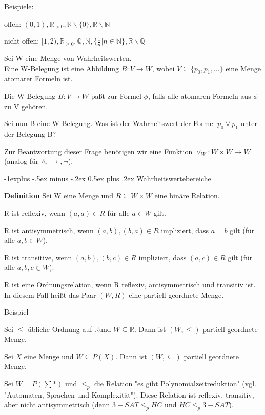 \documentclass[a4paper]{article}
\makeatletter
\renewcommand{\note}[2]{\begin{noteBox} \textbf{#1} #2 \end{noteBox}}
\renewcommand{\subsection}{\@startsection{subsection}{2}{0mm}%
                {-1explus -.5ex minus -.2ex}%
                {0.5ex plus .2ex}%
                {\normalfont\normalsize\bfseries}}
\makeatother
\begin{document}
\begin{multicols}{3}
  Beispiele:
  \begin{itemize*}
    \item offen: $(0,1), \mathbb{R}_{>0}, \mathbb{R}\backslash\{0\}, \mathbb{R}\backslash\mathbb{N}$
    \item nicht offen: $[1,2), \mathbb{R}_{\geq 0}, \mathbb{Q}, \mathbb{N}, \{\frac{1}{n} | n\in\mathbb{N}\}, \mathbb{R}\backslash\mathbb{Q}$
  \end{itemize*}


  Sei W eine Menge von Wahrheitswerten.\\
  Eine W-Belegung ist eine Abbildung $B:V\rightarrow W$, wobei $V\subseteq\{p_0 ,p_1 ,...\}$ eine Menge atomarer Formeln ist.

  Die W-Belegung $B:V\rightarrow W$ paßt zur Formel $\phi$, falls alle atomaren Formeln aus $\phi$ zu V gehören.

  Sei nun B eine W-Belegung. Was ist der Wahrheitswert der Formel $p_0\vee p_1$ unter der Belegung B?

  Zur Beantwortung dieser Frage benötigen wir eine Funktion $\vee_W :W\times W\rightarrow W$ (analog für $\wedge,\rightarrow,\lnot$).

  \subsection{Wahrheitswertebereiche}
  \note{Definition}{Sei W eine Menge und $R\subseteq W\times W$ eine binäre Relation.
    \begin{itemize*}
      \item R ist reflexiv, wenn $(a,a)\in R$ für alle $a\in W$ gilt.
      \item R ist antisymmetrisch, wenn $(a,b),(b,a)\in R$ impliziert, dass $a=b$ gilt (für alle $a,b\in W$).
      \item R ist transitive, wenn $(a,b),(b,c)\in R$ impliziert, dass $(a,c)\in R$ gilt (für alle $a,b,c\in W$).
      \item R ist eine Ordnungsrelation, wenn R reflexiv, antisymmetrisch und transitiv ist. In diesem Fall heißt das Paar $(W,R)$ eine partiell geordnete Menge.
    \end{itemize*}
  }

  Beispiel
  \begin{enumerate*}
    \item Sei $\leq$ übliche Ordnung auf $\mathbb{R}$und $W\subseteq\mathbb{R}$. Dann ist $(W,\leq)$ partiell geordnete Menge.
    \item Sei $X$ eine Menge und $W\subseteq P(X)$. Dann ist $(W,\subseteq)$ partiell geordnete Menge.
    \item Sei $W=P(\sum *)$ und $\leq_p$ die Relation "es gibt Polynomialzeitreduktion" (vgl. "Automaten, Sprachen und Komplexität"). Diese Relation ist reflexiv, transitiv, aber nicht antisymmetrisch (denn $3-SAT\leq_p HC$ und $HC\leq_p 3-SAT$).
  \end{enumerate*}


\end{multicols}
\end{document}
